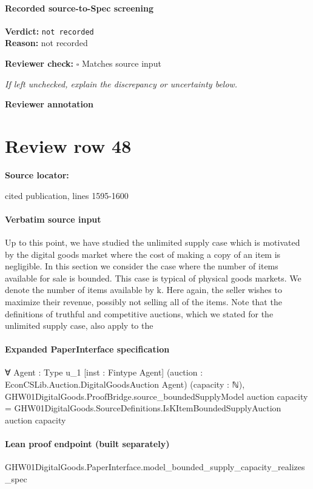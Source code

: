 \documentclass[10pt]{article}
\newcommand{\reviewerbox}{%
  \par\noindent\fbox{\parbox{0.96\linewidth}{\rule{0pt}{0.38in}}}\par
}
\newcommand{\reviewmatch}[1]{%
  \par\noindent\textbf{Reviewer check:} $\square$\; #1\par
  \noindent\emph{If left unchecked, explain the discrepancy or uncertainty below.}\par
}
\begin{document}
\paragraph{Recorded source-to-Spec screening}
\textbf{Verdict:} \texttt{not recorded}
\\
\textbf{Reason:} not recorded
\reviewmatch{Matches source input}
\noindent\textbf{Reviewer annotation}\par
\reviewerbox
\clearpage
\hypertarget{source-claim-7bd2b87e23027c5a}{}
\section*{Review row 48}
\textbf{Source locator:} {\footnotesize\raggedright cited publication, lines 1595-\allowbreak{}1600\par}
\paragraph{Verbatim source input}
\begin{ReviewVerbatim}
Up to this point, we have studied the unlimited supply case which is motivated by the digital goods market where the cost of making a copy of an item is negligible. In this section we consider the case where the
number of items available for sale is bounded. This
case is typical of physical goods markets. We denote the number of items available by k. Here again,
the seller wishes to maximize their revenue, possibly
not selling all of the items. Note that the definitions of truthful and competitive auctions, which we
stated for the unlimited supply case, also apply to the
\end{ReviewVerbatim}


\paragraph{Expanded PaperInterface specification}
\begin{ReviewVerbatim}
∀ {Agent : Type u_1} [inst : Fintype Agent] (auction : EconCSLib.Auction.DigitalGoodsAuction Agent) (capacity : ℕ),
  GHW01DigitalGoods.ProofBridge.source_boundedSupplyModel auction capacity =
    GHW01DigitalGoods.SourceDefinitions.IsKItemBoundedSupplyAuction auction capacity
\end{ReviewVerbatim}

\paragraph{Lean proof endpoint (built separately)}\begin{ReviewVerbatim}
GHW01DigitalGoods.PaperInterface.model_bounded_supply_capacity_realizes_spec
\end{ReviewVerbatim}
\end{document}
